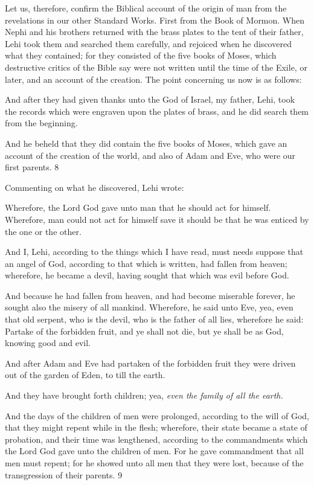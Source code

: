 Let us, therefore, confirm the Biblical account of the origin of man from the revelations in
our other Standard Works. First from the Book of Mormon. When Nephi and his brothers
returned with the brass plates to the tent of their father, Lehi took them and searched them
carefully, and rejoiced when he discovered what they contained; for they consisted of the five
books of Moses, which destructive critics of the Bible say were not written until the time of
the Exile, or later, and an account of the creation. The point concerning us now is as follows:

And after they had given thanks unto the God of Israel, my father, Lehi, took the records
which were engraven upon the plates of brass, and he did search them from the beginning.

And he beheld that they did contain the five books of Moses, which gave an account of the
creation of the world, and also of Adam and Eve, who were our first parents. 8

Commenting on what he discovered, Lehi wrote:

Wherefore, the Lord God gave unto man that he should act for himself. Wherefore, man
could not act for himself save it should be that he was enticed by the one or the other.

And I, Lehi, according to the things which I have read, must needs suppose that an angel of
God, according to that which is written, had fallen from heaven; wherefore, he became a
devil, having sought that which was evil before God.

And because he had fallen from heaven, and had become miserable forever, he sought also
the misery of all mankind. Wherefore, he said unto Eve, yea, even that old serpent, who is the
devil, who is the father of all lies, wherefore he said: Partake of the forbidden fruit, and ye
shall not die, but ye shall be as God, knowing good and evil.

And after Adam and Eve had partaken of the forbidden fruit they were driven out of the
garden of Eden, to till the earth.

And they have brought forth children; yea, \textit{even the family of all the earth.}

And the days of the children of men were prolonged, according to the will of God, that they
might repent while in the flesh; wherefore, their state became a state of probation, and their
time was lengthened, according to the commandments which the Lord God gave unto the
children of men. For he gave commandment that all men must repent; for he showed unto all
men that they were lost, because of the transgression of their parents. 9

